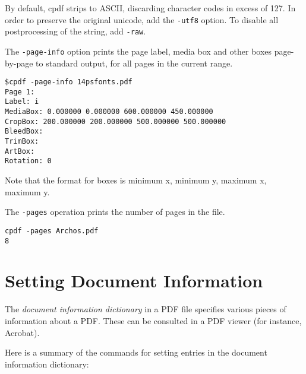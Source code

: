 \documentclass{book}
\newcommand{\smallgap}{\bigskip}
\begin{document}
By default, cpdf strips to ASCII, discarding character codes in excess of 127. In order to preserve the original unicode, add the \texttt{-utf8} option. To disable all postprocessing of the string, add \texttt{-raw}.

\vspace{4mm}
The \texttt{-page-info} option prints the page label, media box and other boxes
page-by-page to standard output, for all pages in the current range.

\begin{framed}
{\small\begin{verbatim}
$cpdf -page-info 14psfonts.pdf
Page 1:
Label: i
MediaBox: 0.000000 0.000000 600.000000 450.000000
CropBox: 200.000000 200.000000 500.000000 500.000000
BleedBox: 
TrimBox: 
ArtBox:
Rotation: 0
\end{verbatim}}
\end{framed}

\noindent Note that the format for boxes is minimum x, minimum y, maximum x, maximum y.

\smallgap 
\noindent The \texttt{-pages} operation prints the number of pages in the file.
\begin{framed}
{\small\begin{verbatim}
cpdf -pages Archos.pdf
8
\end{verbatim}}
\end{framed}

\section{Setting Document Information}
\label{setdocinfo}
  The \textit{document information dictionary} in a PDF file specifies various
pieces of information about a PDF. These can be consulted in a PDF viewer (for
instance, Acrobat).

  Here is a summary of the commands for setting entries in the document
information dictionary:
\end{document}

